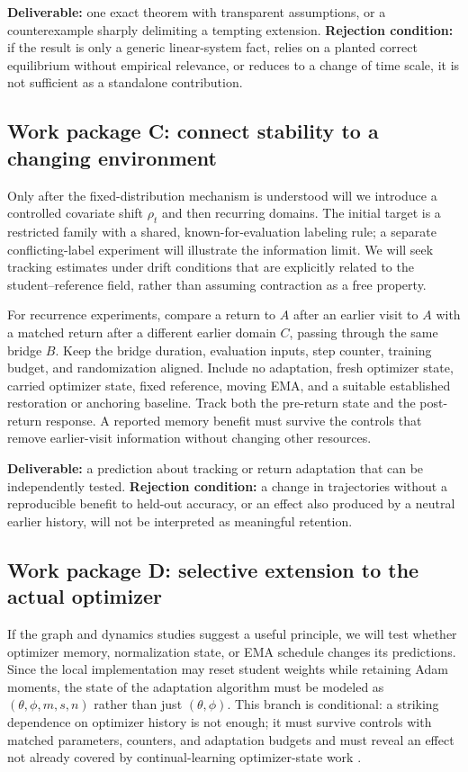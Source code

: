 \documentclass[11pt,a4paper]{article}
\begin{document}
\textbf{Deliverable:} one exact theorem with transparent assumptions, or a counterexample sharply delimiting a tempting extension. \textbf{Rejection condition:} if the result is only a generic linear-system fact, relies on a planted correct equilibrium without empirical relevance, or reduces to a change of time scale, it is not sufficient as a standalone contribution.

\subsection{Work package C: connect stability to a changing environment}
Only after the fixed-distribution mechanism is understood will we introduce a controlled covariate shift $\rho_t$ and then recurring domains. The initial target is a restricted family with a shared, known-for-evaluation labeling rule; a separate conflicting-label experiment will illustrate the information limit. We will seek tracking estimates under drift conditions that are explicitly related to the student--reference field, rather than assuming contraction as a free property.

For recurrence experiments, compare a return to $A$ after an earlier visit to $A$ with a matched return after a different earlier domain $C$, passing through the same bridge $B$. Keep the bridge duration, evaluation inputs, step counter, training budget, and randomization aligned. Include no adaptation, fresh optimizer state, carried optimizer state, fixed reference, moving EMA, and a suitable established restoration or anchoring baseline. Track both the pre-return state and the post-return response. A reported memory benefit must survive the controls that remove earlier-visit information without changing other resources.

\textbf{Deliverable:} a prediction about tracking or return adaptation that can be independently tested. \textbf{Rejection condition:} a change in trajectories without a reproducible benefit to held-out accuracy, or an effect also produced by a neutral earlier history, will not be interpreted as meaningful retention.

\subsection{Work package D: selective extension to the actual optimizer}
If the graph and dynamics studies suggest a useful principle, we will test whether optimizer memory, normalization state, or EMA schedule changes its predictions. Since the local implementation may reset student weights while retaining Adam moments, the state of the adaptation algorithm must be modeled as $(\theta,\phi,m,s,n)$ rather than just $(\theta,\phi)$. This branch is conditional: a striking dependence on optimizer history is not enough; it must survive controls with matched parameters, counters, and adaptation budgets and must reveal an effect not already covered by continual-learning optimizer-state work \cite{kang2024,petta2024}.
\end{document}
